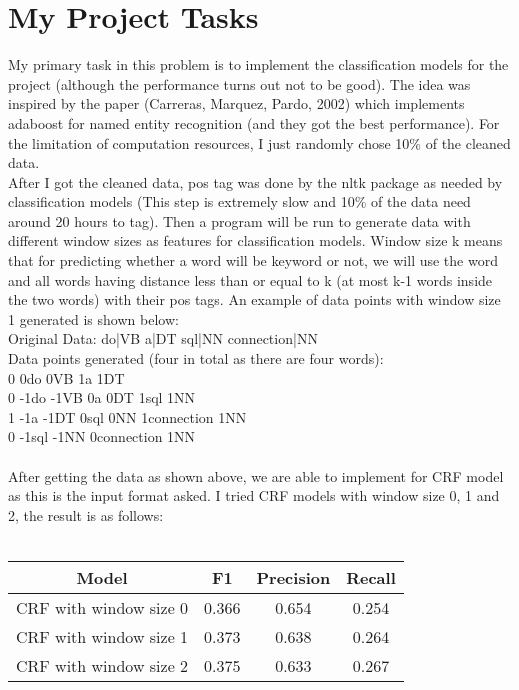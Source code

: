 \documentclass[paper=a4, fontsize=11pt]{scrartcl} %
\numberwithin{equation}{section} %
\numberwithin{figure}{section} %
\numberwithin{table}{section} %
\begin{document}
\section{My Project Tasks}
My primary task in this problem is to implement the classification models for the project (although the performance turns out not to be good). The idea was inspired by the paper (Carreras, Marquez, Pardo, 2002) which implements adaboost for named entity recognition (and they got the best performance). For the limitation of computation resources, I just randomly chose 10\% of the cleaned data.\\
After I got the cleaned data, pos tag was done by the nltk package as needed by classification models (This step is extremely slow and 10\% of the data need around 20 hours to tag). Then a program will be run to generate data with different window sizes as features for classification models. Window size k means that for predicting whether a word will be keyword or not, we will use the word and all words having distance less than or equal to k (at most k-1 words inside the two words) with their pos tags. An example of data points with window size 1 generated is shown below: \\
Original Data:  do|VB a|DT sql|NN connection|NN \\
Data points generated (four in total as there are four words): \\
0 0do 0VB 1a 1DT \\
0 -1do -1VB 0a 0DT 1sql 1NN \\
1 -1a -1DT 0sql 0NN 1connection 1NN\\
0 -1sql -1NN 0connection 1NN\\
\ \\
After getting the data as shown above, we are able to implement for CRF model as this is the input format asked. I tried CRF models with window size 0, 1 and 2, the result is as follows: \\
\ \\
\begin{tabular}{|c|c|c|c|}
\hline
Model & F1 & Precision & Recall \\
\hline
CRF with window size 0 & 0.366 & 0.654 & 0.254 \\
\hline
CRF with window size 1 & 0.373 & 0.638 & 0.264 \\
\hline
CRF with window size 2 & 0.375 & 0.633 & 0.267 \\
\hline 
\end{tabular}
\ \\
\ \\
\end{document}
